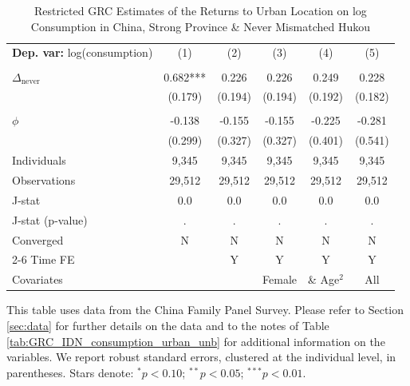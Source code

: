 \begin{table}[htbp] \centering \begin{threeparttable}
 \caption{Restricted GRC Estimates of the Returns to Urban Location on log Consumption in China, Strong Province & Never Mismatched Hukou} 
 \label{tab:GRC_CHN_s_nm_consumption_urban_unb} 
\begin{tabular}{l ccccc} \toprule  \textbf{Dep. var:}  log(consumption) 
                    &\multicolumn{1}{c}{(1)}   &\multicolumn{1}{c}{(2)}   &\multicolumn{1}{c}{(3)}   &\multicolumn{1}{c}{(4)}   &\multicolumn{1}{c}{(5)}   \\
                    &               &               &               &               &               \\
\addlinespace
$\Delta_{\text{never}}$&       0.682***&       0.226   &       0.226   &       0.249   &       0.228   \\
                    &     (0.179)   &     (0.194)   &     (0.194)   &     (0.192)   &     (0.182)   \\
                    &               &               &               &               &               \\
\addlinespace
$\phi$              &      -0.138   &      -0.155   &      -0.155   &      -0.225   &      -0.281   \\
                    &     (0.299)   &     (0.327)   &     (0.327)   &     (0.401)   &     (0.541)   \\
\addlinespace
Individuals         &       9,345   &       9,345   &       9,345   &       9,345   &       9,345   \\
Observations        &      29,512   &      29,512   &      29,512   &      29,512   &      29,512   \\
J-stat              &         0.0   &         0.0   &         0.0   &         0.0   &         0.0   \\
J-stat (p-value)    &           .   &           .   &           .   &           .   &           .   \\
Converged           &           N   &           N   &           N   &           N   &           N   \\
\cmidrule{2-6} Time FE & & Y & Y & Y & Y \\ Covariates & & & Female & \& Age$^2$ & All \\ \bottomrule \end{tabular} \begin{tablenotes}[flushleft] \footnotesize \item{This table uses data from the China Family Panel Survey. Please refer to Section \ref{sec:data} for further details on the data and to the notes of Table \ref{tab:GRC_IDN_consumption_urban_unb} for additional information on the variables. We report robust standard errors, clustered at the individual level, in parentheses. Stars denote: $^{*} p<0.10$; $^{**} p<0.05$; $^{***} p<0.01$.} \end{tablenotes} \end{threeparttable} \end{table}
